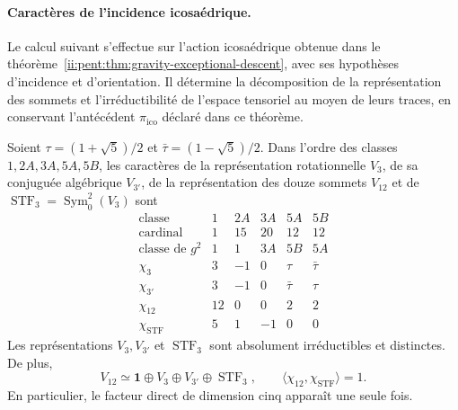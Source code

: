 \paragraph{Caractères de l’incidence icosaédrique.}
Le calcul suivant s’effectue sur l’action icosaédrique obtenue dans le
théorème~\ref{ii:pent:thm:gravity-exceptional-descent}, avec ses hypothèses
d’incidence et d’orientation. Il détermine la décomposition de la
représentation des sommets et l’irréductibilité de l’espace tensoriel
au moyen de leurs traces, en conservant l’antécédent
\(\pi_{\mathrm{ico}}\) déclaré dans ce théorème.

\begin{proposition}
\label{prop:ii-pent-caracteres}
Soient \(\tau=(1+\sqrt5)/2\) et
\(\bar\tau=(1-\sqrt5)/2\). Dans l’ordre des classes
\(1,2A,3A,5A,5B\), les caractères de la représentation rotationnelle
\(V_3\), de sa conjuguée algébrique \(V_{3'}\), de la représentation
des douze sommets \(V_{12}\) et de
\(\operatorname{STF}_3=\operatorname{Sym}^2_0(V_3)\) sont
\begin{equation}
\label{eq:ii-pent-tabla-caracteres}
\begin{array}{c|rrrrr}
\text{classe} &1&2A&3A&5A&5B\\ \hline
\text{cardinal}&1&15&20&12&12\\
\text{classe de }g^2&1&1&3A&5B&5A\\ \hline
\chi_3&3&-1&0&\tau&\bar\tau\\
\chi_{3'}&3&-1&0&\bar\tau&\tau\\
\chi_{12}&12&0&0&2&2\\
\chi_{\mathrm{STF}}&5&1&-1&0&0
\end{array}
\end{equation}
Les représentations \(V_3,V_{3'}\) et
\(\operatorname{STF}_3\) sont absolument irréductibles et distinctes.
De plus,
\begin{equation}
\label{eq:ii-pent-descomposicion-demostrada}
 V_{12}\simeq\mathbf1\oplus V_3\oplus V_{3'}
                  \oplus\operatorname{STF}_3,
 \qquad
 \langle\chi_{12},\chi_{\mathrm{STF}}\rangle=1.
\end{equation}
En particulier, le facteur direct de dimension cinq apparaît une seule fois.
\end{proposition}

